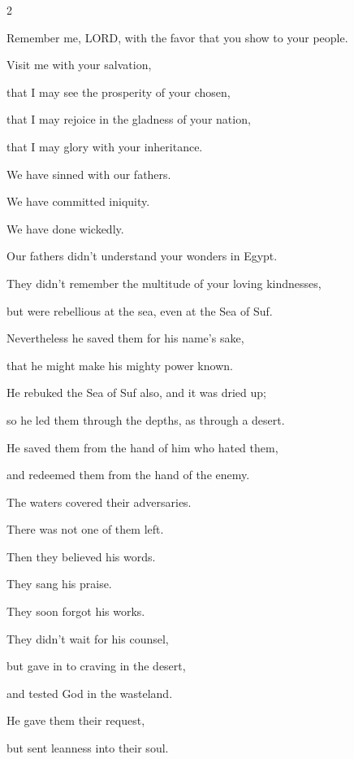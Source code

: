 \begin{multicols}{2}
	
	\myverse{}Remember me, LORD, with the favor that you show to your people.
	
	Visit me with your salvation,
	
	
	\myverse{}that I may see the prosperity of your chosen,
	
	that I may rejoice in the gladness of your nation,
	
	that I may glory with your inheritance.
	
	\vspace{\baselineskip}
	
	\myverse{}We have sinned with our fathers.
	
	We have committed iniquity.
	
	We have done wickedly.
	
	
	\myverse{}Our fathers didn’t understand your wonders in Egypt.
	
	They didn’t remember the multitude of your loving kindnesses,
	
	but were rebellious at the sea, even at the Sea of Suf.
	
	
	\myverse{}Nevertheless he saved them for his name’s sake,
	
	that he might make his mighty power known.
	
	
	\myverse{}He rebuked the Sea of Suf also, and it was dried up;
	
	so he led them through the depths, as through a desert.
	
	
	\myverse{}He saved them from the hand of him who hated them,
	
	and redeemed them from the hand of the enemy.
	
	
	\myverse{}The waters covered their adversaries.
	
	There was not one of them left.
	
	
	\myverse{}Then they believed his words.
	
	They sang his praise.
	
	\vspace{\baselineskip}
	
	\myverse{}They soon forgot his works.
	
	They didn’t wait for his counsel,
	
	
	\myverse{}but gave in to craving in the desert,
	
	and tested God in the wasteland.
	
	
	\myverse{}He gave them their request,
	
	but sent leanness into their soul.
	

\end{multicols}
